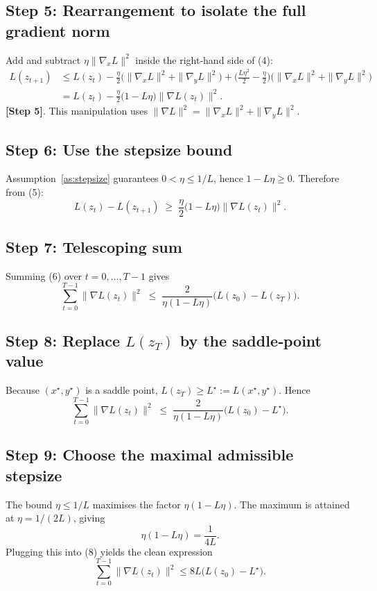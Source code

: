\documentclass[11pt]{article}
\begin{document}
\subsection*{Step 5: Rearrangement to isolate the full gradient norm}
Add and subtract \(\eta\|\nabla_{x}L\|^{2}\) inside the right‑hand side of (4):
\[
\begin{aligned}
L(z_{t+1})
&\le L(z_{t})
-\frac{\eta}{2}\big(\|\nabla_{x}L\|^{2}+\|\nabla_{y}L\|^{2}\big)
+\Big(\frac{L\eta^{2}}{2}-\frac{\eta}{2}\Big)
\big(\|\nabla_{x}L\|^{2}+\|\nabla_{y}L\|^{2}\big)\\
&= L(z_{t})
-\frac{\eta}{2}\big(1-L\eta\big)\big\|\nabla L(z_{t})\big\|^{2}. \tag{5}
\end{aligned}
\]
\textbf{[Step 5]}. This manipulation uses \(\|\nabla L\|^{2}= \|\nabla_{x}L\|^{2}+\|\nabla_{y}L\|^{2}\).

\subsection*{Step 6: Use the stepsize bound}
Assumption~\ref{as:stepsize} guarantees \(0<\eta\le 1/L\), hence \(1-L\eta\ge0\). Therefore from (5):
\[
L(z_{t})-L(z_{t+1})\;\ge\; \frac{\eta}{2}\big(1-L\eta\big)\big\|\nabla L(z_{t})\big\|^{2}. \tag{6}
\]

\subsection*{Step 7: Telescoping sum}
Summing (6) over \(t=0,\dots,T-1\) gives
\[
\sum_{t=0}^{T-1}\big\|\nabla L(z_{t})\big\|^{2}
\;\le\; \frac{2}{\eta(1-L\eta)}\big(L(z_{0})-L(z_{T})\big). \tag{7}
\]

\subsection*{Step 8: Replace \(L(z_{T})\) by the saddle‑point value}
Because \((x^{\star},y^{\star})\) is a saddle point,
\(L(z_{T})\ge L^{\star}:=L(x^{\star},y^{\star})\). Hence
\[
\sum_{t=0}^{T-1}\big\|\nabla L(z_{t})\big\|^{2}
\;\le\; \frac{2}{\eta(1-L\eta)}\big(L(z_{0})-L^{\star}\big). \tag{8}
\]

\subsection*{Step 9: Choose the maximal admissible stepsize}
The bound \(\eta\le 1/L\) maximises the factor \(\eta(1-L\eta)\). The maximum is attained at \(\eta=1/(2L)\), giving
\[
\eta(1-L\eta)=\frac{1}{4L}.
\]
Plugging this into (8) yields the clean expression
\[
\sum_{t=0}^{T-1}\big\|\nabla L(z_{t})\big\|^{2}
\le 8L\big(L(z_{0})-L^{\star}\big). \tag{9}
\]
\end{document}
